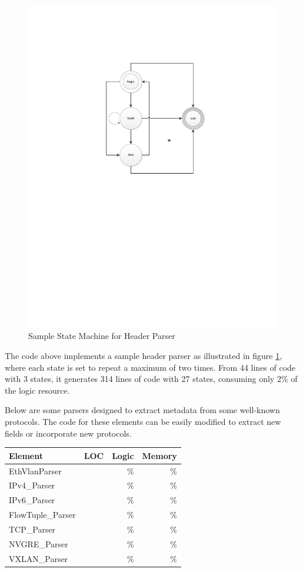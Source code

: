 \begin{figure}[!t]
	\centering
	\includegraphics[width=0.7\columnwidth]{image/StateMachine}
	\vspace{-0.15in}
	\caption{Sample State Machine for Header Parser}
	\vspace{-0.15in}
	\label{clicknp:fig:StateMachine}
\end{figure}

The code above implements a sample header parser as illustrated in figure \ref{clicknp:fig:StateMachine}, where each state is set to repeat a maximum of two times. From 44 lines of code with 3 states, it generates 314 lines of code with 27 states, consuming only 2\% of the logic resource.

Below are some parsers designed to extract metadata from some well-known protocols. The code for these elements can be easily modified to extract new fields or incorporate new protocols.

\begin{table}[h!]
	\centering
	\label{clicknp:tab:PacketParsers}
	\begin{tabular}{l|r|r|r}
		Element & LOC & Logic & Memory \\
		\hline
		EthVlanParser & & \% & \% \\
		IPv4\_Parser & & \% & \% \\
		IPv6\_Parser & & \% & \% \\
		FlowTuple\_Parser & & \% & \% \\
		TCP\_Parser & & \% & \% \\
		NVGRE\_Parser & & \% & \% \\
		VXLAN\_Parser & & \% & \% \\
	\end{tabular}
\end{table}

